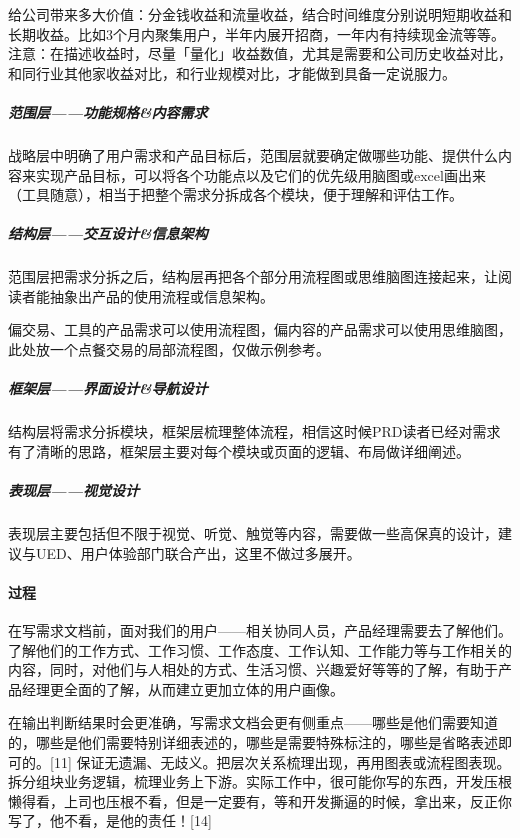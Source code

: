 \documentclass[letterpaper,10pt,english]{sphinxmanual}
\begin{document}
给公司带来多大价值：分金钱收益和流量收益，结合时间维度分别说明短期收益和长期收益。比如3个月内聚集用户，半年内展开招商，一年内有持续现金流等等。
注意：在描述收益时，尽量「量化」收益数值，尤其是需要和公司历史收益对比，和同行业其他家收益对比，和行业规模对比，才能做到具备一定说服力。%
\begin{footnote}[566]\sphinxAtStartFootnote
{}
%
\end{footnote}


\subparagraph{范围层——功能规格\&内容需求}
\label{\detokenize{chapter_knowledge/PRD:id4}}
战略层中明确了用户需求和产品目标后，范围层就要确定做哪些功能、提供什么内容来实现产品目标，可以将各个功能点以及它们的优先级用脑图或excel画出来（工具随意），相当于把整个需求分拆成各个模块，便于理解和评估工作。


\subparagraph{结构层——交互设计\&信息架构}
\label{\detokenize{chapter_knowledge/PRD:id5}}
范围层把需求分拆之后，结构层再把各个部分用流程图或思维脑图连接起来，让阅读者能抽象出产品的使用流程或信息架构。

偏交易、工具的产品需求可以使用流程图，偏内容的产品需求可以使用思维脑图，此处放一个点餐交易的局部流程图，仅做示例参考。


\subparagraph{框架层——界面设计\&导航设计}
\label{\detokenize{chapter_knowledge/PRD:id6}}
结构层将需求分拆模块，框架层梳理整体流程，相信这时候PRD读者已经对需求有了清晰的思路，框架层主要对每个模块或页面的逻辑、布局做详细阐述。


\subparagraph{表现层——视觉设计}
\label{\detokenize{chapter_knowledge/PRD:id7}}
表现层主要包括但不限于视觉、听觉、触觉等内容，需要做一些高保真的设计，建议与UED、用户体验部门联合产出，这里不做过多展开。


\paragraph{过程}
\label{\detokenize{chapter_knowledge/PRD:id8}}
在写需求文档前，面对我们的用户——相关协同人员，产品经理需要去了解他们。了解他们的工作方式、工作习惯、工作态度、工作认知、工作能力等与工作相关的内容，同时，对他们与人相处的方式、生活习惯、兴趣爱好等等的了解，有助于产品经理更全面的了解，从而建立更加立体的用户画像。

在输出判断结果时会更准确，写需求文档会更有侧重点——哪些是他们需要知道的，哪些是他们需要特别详细表述的，哪些是需要特殊标注的，哪些是省略表述即可的。{[}11{]}
保证无遗漏、无歧义。把层次关系梳理出现，再用图表或流程图表现。拆分组块业务逻辑，梳理业务上下游。实际工作中，很可能你写的东西，开发压根懒得看，上司也压根不看，但是一定要有，等和开发撕逼的时候，拿出来，反正你写了，他不看，是他的责任！{[}14{]}
\end{document}
